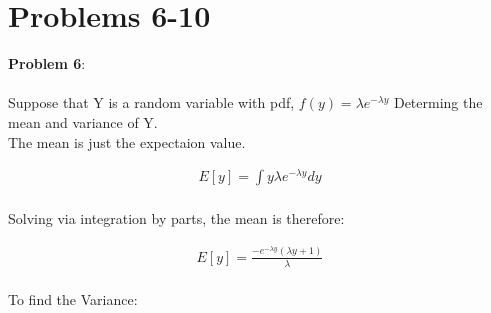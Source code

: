 \documentclass{exam}
\begin{document}
\pagebreak



\section{Problems 6-10}


\textbf{Problem 6}:
\\
\\
Suppose that Y is a random variable with pdf, $f(y) = \lambda e^{-\lambda y}$ Determing the mean and variance of Y.
\\
The mean is just the expectaion value.

\begin{equation}
\begin{gathered}
E[y] = \int y \lambda e^{-\lambda y}dy \\
\end{gathered}
\end{equation} 

\noindent
Solving via integration by parts, the mean is therefore:

\begin{equation}
\begin{gathered}
E[y] = \frac{-e^{-\lambda y}(\lambda y + 1)}{\lambda}
\end{gathered}
\end{equation} 
\\
\noindent
To find the Variance:
\end{document}

